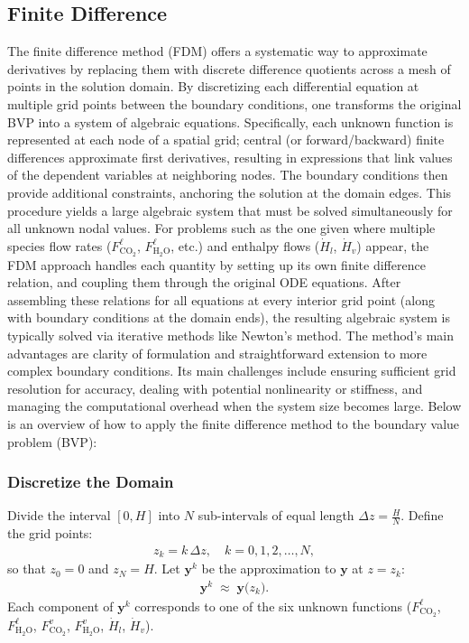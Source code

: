 \documentclass[a4paper,fleqn]{cas-sc}
\newcommand{\liq}{\ell}
\newcommand{\vap}{v}
\begin{document}
    \subsection{Finite Difference}
    The finite difference method (FDM) offers a systematic way to approximate derivatives by replacing them with discrete difference quotients across a mesh of points in the solution domain. By discretizing each differential equation at multiple grid points between the boundary conditions, one transforms the original BVP into a system of algebraic equations. Specifically, each unknown function is represented at each node of a spatial grid; central (or forward/backward) finite differences approximate first derivatives, resulting in expressions that link values of the dependent variables at neighboring nodes. The boundary conditions then provide additional constraints, anchoring the solution at the domain edges. This procedure yields a large algebraic system that must be solved simultaneously for all unknown nodal values. For problems such as the one given where multiple species flow rates ($F^{\liq}_{\mathrm{CO_2}}$, $F^{\liq}_{\mathrm{H_2O}}$, etc.) and enthalpy flows ($\dot{H}_l$, $\dot{H}_v$) appear, the FDM approach handles each quantity by setting up its own finite difference relation, and coupling them through the original ODE equations. After assembling these relations for all equations at every interior grid point (along with boundary conditions at the domain ends), the resulting algebraic system is typically solved via iterative methods like Newton’s method. The method’s main advantages are clarity of formulation and straightforward extension to more complex boundary conditions. Its main challenges include ensuring sufficient grid resolution for accuracy, dealing with potential nonlinearity or stiffness, and managing the computational overhead when the system size becomes large. Below is an overview of how to apply the finite difference method to the boundary value problem (BVP):

    \subsubsection*{Discretize the Domain}
    Divide the interval $[0,H]$ into $N$ sub-intervals of equal length $\Delta z = \frac{H}{N}$. Define the grid points:
    \begin{align}
        z_k = k\,\Delta z, \quad k = 0, 1, 2, \ldots, N,
    \end{align}
    so that $z_0 = 0$ and $z_N = H$. Let $\mathbf{y}^k$ be the approximation to $\mathbf{y}$ at $z = z_k$:
    \begin{align}
        \mathbf{y}^k \;\approx\; \mathbf{y}\bigl(z_k\bigr).
    \end{align}
    Each component of $\mathbf{y}^k$ corresponds to one of the six unknown functions ($F^{\liq}_{\mathrm{CO_2}}$, $F^{\liq}_{\mathrm{H_2O}}$, $F^{\vap}_{\mathrm{CO_2}}$, $F^{\vap}_{\mathrm{H_2O}}$, $\dot{H}_l$, $\dot{H}_v$).
\end{document}
